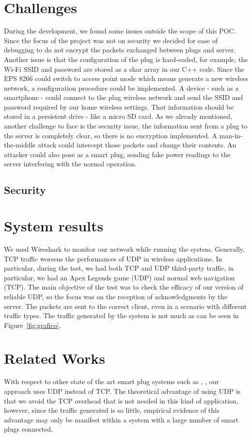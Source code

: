 \documentclass[conference]{IEEEtran}
\begin{document}
	\section{Challenges}
	During the development, we found some issues outside the scope of this POC. Since the focus of the project was not on security we decided for ease of debugging to do not encrypt the packets exchanged between plugs and server. Another issue is that the configuration of the plug is hard-coded, for example, the Wi-Fi SSID and password are stored as a char array in our C++ code. Since the EPS 8266 could switch to access point mode which means generate a new wireless network, a configuration procedure could be implemented. A device - such as a smartphone - could connect to the plug wireless network and send the SSID and password required by our home wireless settings. That information should be stored in a persistent drive - like a micro SD card.
	As we already mentioned, another challenge to face is the security issue, the information sent from a plug to the server is completely clear, so there is no encryption implemented. A man-in-the-middle attack could intercept those packets and change their contents. An attacker could also pose as a smart plug, sending fake power readings to the server interfering with the normal operation.
	\subsection{Security}
	
	\section{System results}
	We used Wireshark to monitor our network while running the system. Generally, TCP traffic worsens the performances of UDP in wireless applications. In particular, during the test, we had both TCP and UDP third-party traffic, in particular, we had an Apex Legends game (UDP) and normal web navigation (TCP). The main objective of the test was to check the efficacy of our version of reliable UDP, so the focus was on the reception of acknowledgments by the server. The packets are sent to the correct client, even in a scenario with different traffic types. The traffic generated by the system is not much as can be seen in Figure~\ref{fig:grafico}.
	
	\section{Related Works}
	With respect to other state of the art smart plug systems such as \cite{8612412}, \cite{8110428}, our approach uses UDP instead of TCP. The theoretical advantage of using UDP is that we avoid the TCP overhead that is not needed in this kind of application, however, since the traffic generated is so little, empirical evidence of this advantage may only be manifest within a system with a large number of smart plugs connected. 
	
\end{document}
